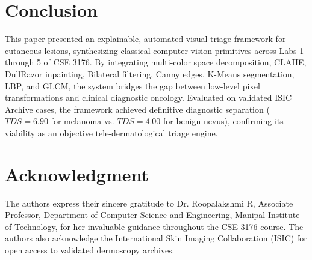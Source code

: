 \documentclass[conference]{IEEEtran}
\begin{document}
\section{Conclusion}
This paper presented an explainable, automated visual triage framework for cutaneous lesions, synthesizing classical computer vision primitives across Labs 1 through 5 of CSE 3176. By integrating multi-color space decomposition, CLAHE, DullRazor inpainting, Bilateral filtering, Canny edges, K-Means segmentation, LBP, and GLCM, the system bridges the gap between low-level pixel transformations and clinical diagnostic oncology. Evaluated on validated ISIC Archive cases, the framework achieved definitive diagnostic separation ($TDS=6.90$ for melanoma vs. $TDS=4.00$ for benign nevus), confirming its viability as an objective tele-dermatological triage engine.

\section*{Acknowledgment}
The authors express their sincere gratitude to Dr. Roopalakshmi R, Associate Professor, Department of Computer Science and Engineering, Manipal Institute of Technology, for her invaluable guidance throughout the CSE 3176 course. The authors also acknowledge the International Skin Imaging Collaboration (ISIC) for open access to validated dermoscopy archives.



\end{document}
